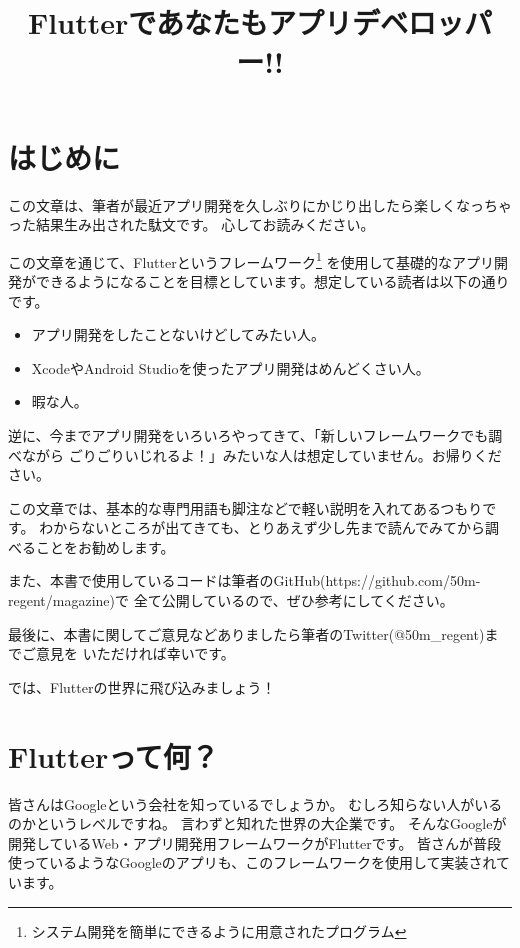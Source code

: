 \documentclass{jsarticle}
\title{Flutterであなたもアプリデベロッパー!!}
\author{}
\date{}
\begin{document}
    \maketitle
    \tableofcontents

    \section*{はじめに}
        この文章は、筆者が最近アプリ開発を久しぶりにかじり出したら楽しくなっちゃった結果生み出された駄文です。
        心してお読みください。

        この文章を通じて、Flutterというフレームワーク\footnote{システム開発を簡単にできるように用意されたプログラム}
        を使用して基礎的なアプリ開発ができるようになることを目標としています。想定している読者は以下の通りです。

        \begin{itemize}
            \item アプリ開発をしたことないけどしてみたい人。
            \item XcodeやAndroid Studioを使ったアプリ開発はめんどくさい人。
            \item 暇な人。
        \end{itemize}

        逆に、今までアプリ開発をいろいろやってきて、「新しいフレームワークでも調べながら
        ごりごりいじれるよ！」みたいな人は想定していません。お帰りください。

        この文章では、基本的な専門用語も脚注などで軽い説明を入れてあるつもりです。
        わからないところが出てきても、とりあえず少し先まで読んでみてから調べることをお勧めします。

        また、本書で使用しているコードは筆者のGitHub(https://github.com/50m-regent/magazine)で
        全て公開しているので、ぜひ参考にしてください。

        最後に、本書に関してご意見などありましたら筆者のTwitter(@50m\_regent)までご意見を
        いただければ幸いです。

        では、Flutterの世界に飛び込みましょう！

    \section*{Flutterって何？}
        皆さんはGoogleという会社を知っているでしょうか。
        むしろ知らない人がいるのかというレベルですね。
        言わずと知れた世界の大企業です。
        そんなGoogleが開発しているWeb・アプリ開発用フレームワークがFlutterです。
        皆さんが普段使っているようなGoogleのアプリも、このフレームワークを使用して実装されています。
\end{document}
